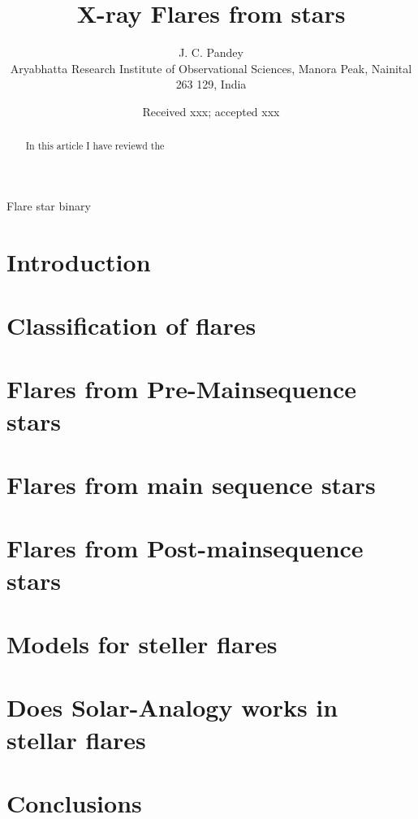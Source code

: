 


\title[Flares from stars]{X-ray Flares from stars}

\author[J. C. Pandey]{J. C. Pandey \\
Aryabhatta Research Institute of Observational Sciences, Manora Peak, Nainital 263 129, India\\
}
\date{Received xxx; accepted xxx}
\maketitle
\label{firstpage}

\begin{abstract}
In this article I have reviewd the 
\end{abstract}

\begin{keywords}
Flare star binary
\end{keywords}



\section{Introduction} \label{sec:intro}
\section{Classification of flares}\label{}
\section{Flares from Pre-Mainsequence stars}
\section{Flares from main sequence stars}
\section{Flares from Post-mainsequence stars}
\section{Models for steller flares}
\section{Does Solar-Analogy works in stellar flares}
\section{Conclusions}

